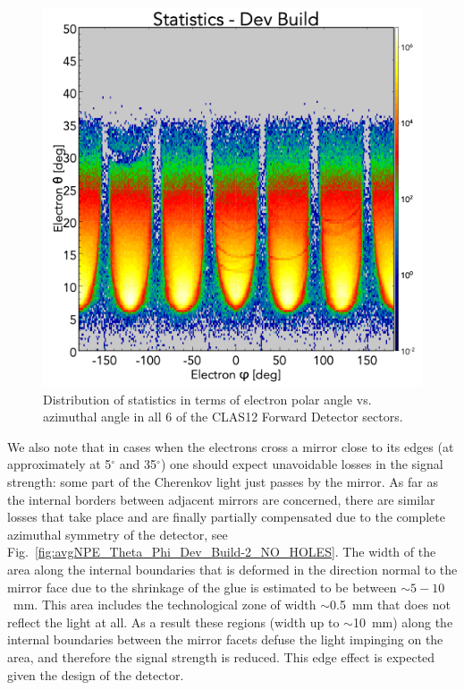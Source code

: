 \begin{figure}[!ht]
    \centering
    \includegraphics[width=1.0\linewidth,trim={0.0cm 0.0cm 0.0cm 1.67cm},clip]{images/statistics_Theta_Phi_Dev_Build_NO_HOLES.png}
    \caption{Distribution of statistics in terms of electron polar angle vs. azimuthal angle in all 6 of the CLAS12
      Forward Detector sectors.}
    \label{fig:statistics_Theta_Phi_Dev_Build_NO_HOLES}
\end{figure}

We also note that in cases when the electrons cross a mirror close to its edges (at approximately at 5$^\circ$ and
35$^\circ$) one should expect unavoidable losses in the signal strength: some part of the Cherenkov light just passes
by the mirror. As far as the internal borders between adjacent mirrors are concerned, there are similar losses that
take place and are finally partially compensated due to the complete azimuthal symmetry of the detector, see
Fig.~\ref{fig:avgNPE_Theta_Phi_Dev_Build-2_NO_HOLES}. The width of the area along the internal boundaries that
is deformed in the direction normal to the mirror face due to the shrinkage of the glue is estimated to be between
$\sim 5 - 10$~mm. This area includes the technological zone of width $\sim$0.5~mm that does not reflect the light at
all. As a result these regions (width up to $\sim$10~mm) along the internal boundaries between the mirror facets
defuse the light impinging on the area, and therefore the signal strength is reduced. This edge effect is expected
given the design of the detector.
